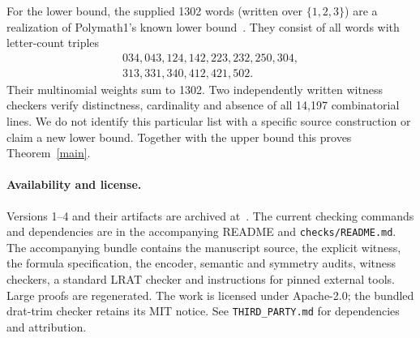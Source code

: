 \documentclass[11pt]{article}
\begin{document}
For the lower bound, the supplied 1302 words (written over $\{1,2,3\}$) are a realization of Polymath1's known lower bound~\cite[Section 2]{polymath}. They consist of all words with letter-count triples
\[
\begin{gathered}
034,043,124,142,223,232,250,304,\\
313,331,340,412,421,502.
\end{gathered}
\]
Their multinomial weights sum to 1302. Two independently written witness checkers verify distinctness, cardinality and absence of all 14,197 combinatorial lines. We do not identify this particular list with a specific source construction or claim a new lower bound. Together with the upper bound this proves Theorem~\ref{main}.

\paragraph{Availability and license.}
Versions 1--4 and their artifacts are archived at~\cite{previousone,previous,previousthree,previousfour}. The current checking commands and dependencies are in the accompanying README and \texttt{checks/README.md}. The accompanying bundle contains the manuscript source, the explicit witness, the formula specification, the encoder, semantic and symmetry audits, witness checkers, a standard LRAT checker and instructions for pinned external tools. Large proofs are regenerated. The work is licensed under Apache-2.0; the bundled drat-trim checker retains its MIT notice. See \texttt{THIRD\_PARTY.md} for dependencies and attribution.
\end{document}
